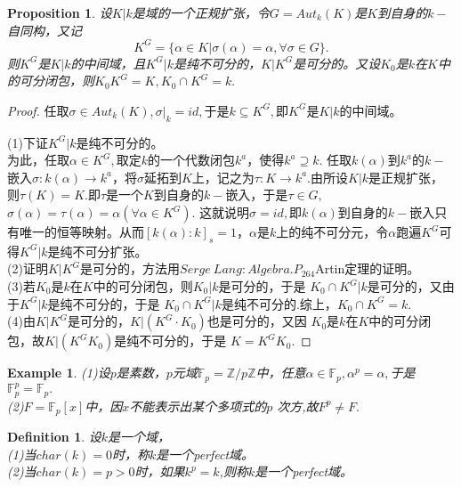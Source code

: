 \documentclass[UTF8]{article}
\newtheorem{defn}{Definition}[section]
\newtheorem{prop}{Proposition}[section]
\newtheorem{exa}{Example}[section]
\begin{document}
\begin{prop}
设$K|k$是域的一个正规扩张，令$G=Aut_{k}(K)$是$K$到自身的$k-$自同构，又记
$$
K^{G}=\{\alpha\in K|\sigma(\alpha)=\alpha,\forall \sigma \in G\}.
$$
则$K^{G}$是$K|k$的中间域，且$K^{G}|k$是纯不可分的，$K|K^{G}$是可分的。又设$K_{0}$是$k$在$K$中的可分闭包，则$K_{0}K^{G}=K,K_{0}\cap K^{G}=k.$
\end{prop}
\begin{proof}
	任取$\sigma\in Aut_{k}(K),\sigma|_{k}=id,$于是$k\subseteq K^{G},$即$K^{G}$是$K|k$的中间域。
	
	
	(1)下证$K^{G}|k$是纯不可分的。\\
	为此，任取$\alpha\in K^{G},$取定$k$的一个代数闭包$k^{a}$，使得$k^{a}\supseteq k.$
	任取$k(\alpha)$到$k^{a}$的$k-$嵌入$\sigma:k(\alpha)\rightarrow k^{a}$，将$\sigma $延拓到$K$上，记之为$\tau:K\rightarrow k^{a}$.由所设$K|k$是正规扩张，则$\tau(K)=K.$即$\tau$是一个$K$到自身的$k-$嵌入，于是$\tau \in G,$ $\sigma(\alpha)=\tau(\alpha)=\alpha(\forall \alpha \in K^{G}).$
	这就说明$\sigma=id,$即$k(\alpha)$到自身的$k-$嵌入只有唯一的恒等映射。从而$[k(\alpha):k]_{s}=1$，$\alpha$是$k$上的纯不可分元，令$\alpha$跑遍$K^{G}$可得$K^{G}|k$是纯不可分扩张。\\
	(2)证明$K|K^{G}$是可分的，方法用$Serge\ Lang:Algebra.P_{264}$Artin定理的证明。\\
	(3)若$K_{0}$是$k$在$K$中的可分闭包，则$K_{0}|k$是可分的，于是
	$K_{0}\cap K^{G}|k$是可分的，又由于$K^{G}|k$是纯不可分的，于是
	$K_{0}\cap K^{G}|k$是纯不可分的.综上，$K_{0}\cap K^{G}=k.$\\
	(4)由$K|K^{G}$是可分的，$K|(K^{G}\cdot K_{0})$也是可分的，又因
	$K_{0}$是$k$在$K$中的可分闭包，故$K|(K^{G}K_{0})$是纯不可分的，于是
	$K=K^{G}K_{0}.$
\end{proof}
\begin{exa}

(1)设$p$是素数，$p$元域$\mathbb{F}_{p}=\mathbb{Z}/p\mathbb{Z}$中，任意$\alpha\in \mathbb{F}_{p},\alpha^{p}=\alpha,$于是$\mathbb{F}_{p}^{p}=\mathbb{F}_{p}.$\\
(2)$F=\mathbb{F}_{p}[x]$中，因$x$不能表示出某个多项式的$p$
次方,故$F^{p}\neq F.$
\end{exa}
\begin{defn}

设$k$是一个域，\\
(1)当$char(k)=0$时，称$k$是一个perfect域。\\
(2)当$char(k)=p>0$时，如果$k^{p}=k$,则称$k$是一个perfect域。\\
\end{defn}
\end{document}
